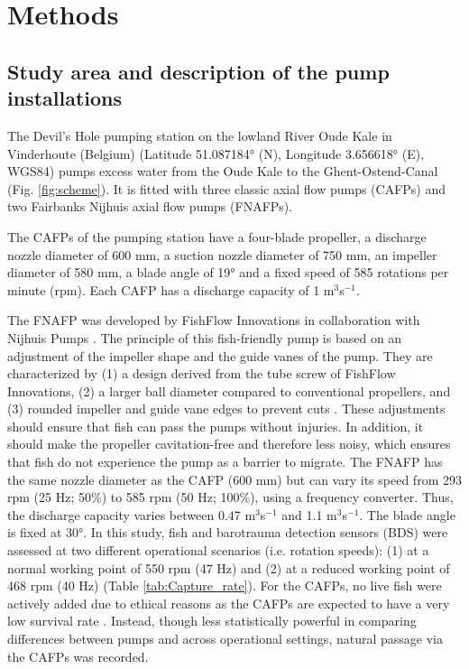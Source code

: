 \documentclass[fleqn,10pt]{wlscirep}
\begin{document}
\section*{Methods}

\subsection*{Study area and description of the pump installations} 

The Devil’s Hole pumping station on the lowland River Oude Kale in Vinderhoute (Belgium) (Latitude 51.087184° (N), Longitude 3.656618° (E), WGS84) pumps excess water from the Oude Kale to the Ghent-Ostend-Canal (Fig. \ref{fig:scheme}). It is fitted with three classic axial flow pumps (CAFPs) and two Fairbanks Nijhuis axial flow pumps (FNAFPs). 

The CAFPs of the pumping station have a four-blade propeller, a discharge nozzle diameter of 600 mm, a suction nozzle diameter of 750 mm, an impeller diameter of 580 mm, a blade angle of 19° and a fixed speed of 585 rotations per minute (rpm). Each CAFP has a discharge capacity of 1 m$^{3}$s$^{-1}$. 

The FNAFP was developed by FishFlow Innovations in collaboration with Nijhuis Pumps \cite{Vriese2009OnderzoekBuisvijzel}. The principle of this fish-friendly pump is based on an adjustment of the impeller shape and the guide vanes of the pump. They are characterized by (1) a design derived from the tube screw of FishFlow Innovations, (2) a larger ball diameter compared to conventional propellers, and (3) rounded impeller and guide vane edges to prevent cuts \cite{Arnold2009Fish-friendlyDK2295808T3}. These adjustments should ensure that fish can pass the pumps without injuries. In addition, it should make the propeller cavitation-free and therefore less noisy, which ensures that fish do not experience the pump as a barrier to migrate. The FNAFP has the same nozzle diameter as the CAFP (600 mm) but can vary its speed from 293 rpm (25 Hz; 50\%) to 585 rpm (50 Hz; 100\%), using a frequency converter. Thus, the discharge capacity varies between 0.47 m$^{3}$s$^{-1}$ and 1.1 m$^{3}$s$^{-1}$. The blade angle is fixed at 30°. In this study, fish and barotrauma detection sensors (BDS) were assessed at two different operational scenarios (i.e. rotation speeds): (1) at a normal working point of 550  rpm (47 Hz) and (2) at a reduced working point of 468 rpm (40 Hz) (Table \ref{tab:Capture_rate}). For the CAFPs, no live fish were actively added due to ethical reasons as the CAFPs are expected to have a very low survival rate \cite{Buysse2019EvaluatieVinderhoute,Buysse2014MortalityStations}. Instead, though less statistically powerful in comparing differences between pumps and across operational settings, natural passage via the CAFPs was recorded.
\end{document}
